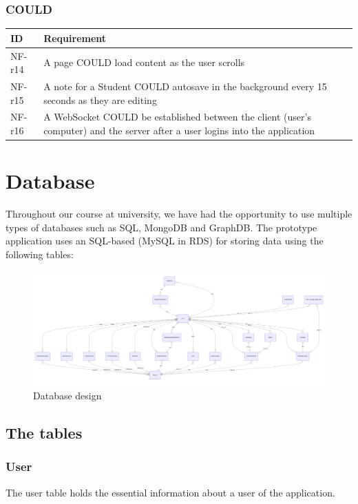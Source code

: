 \subsubsection{COULD}

\begin{tabular}{|p{1cm}|p{13cm}|}
    \hline
        \textbf{ID} & \textbf{Requirement} \\
    \hline
    NF-r14 &
    A page COULD load content as the user scrolls \\
    \hline
    NF-r15 &
    A note for a Student COULD autosave in the background every 15 seconds as they are editing \\
    \hline
    NF-r16 &
    A WebSocket COULD be established between the client (user’s computer) and the server after a user logins into the application \\
    \hline
\end{tabular}

\section{Database}
Throughout our course at university, we have had the opportunity to use multiple types of databases such as SQL, MongoDB and GraphDB. The prototype application uses an SQL-based (MySQL in RDS) for storing data using the following tables:

\begin{figure}[h]
    \includegraphics[scale=0.36]{images/database/database_diagram.png}
    \caption{Database design}
    \label{fig:my_label}
\end{figure}

\subsection{The tables}

\subsubsection{User}
The user table holds the essential information about a user of the application.

